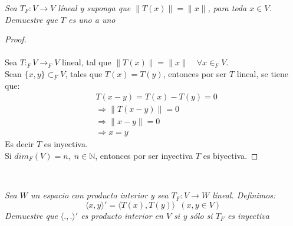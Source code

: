 \documentclass[11pt,letterpaper]{article}
\newcommand{\N}{\mathbb{N}}
\begin{document}
\begin{tcolorbox}[
	title = \textcolor{black}{\textcolor{white}{Problema 1}},]
\textit{Sea $T_F:V\rightarrow V$ l\'ineal y suponga que $\|T(x)\|=\|x\|$, para toda $x\in V$. Demuestre que $T$ es uno a uno
}
\end{tcolorbox}
\begin{proof}\,\\
	\,\\
    Sea $T:_FV\rightarrow_FV$ lineal, tal que $\|T(x)\|=\|x\|\quad \forall x \in _FV$.\\
Sean $\{ x,y\}\subset _FV$, tales que $T(x)=T(y)$, entonces por ser $T$ lineal, se tiene que:\\

\begin{align*}
    &T(x-y)=T(x)-T(y)=0\\
    &\Rightarrow \|T(x-y)\|=0\\
    &\Rightarrow \|x-y\|=0 \\
    &\Rightarrow x=y
\end{align*}
Es decir $T$ es inyectiva.\\[10pt]
Si $dim_F(V)=n,\; n\in \N$, entonces por ser inyectiva $T$ es biyectiva.
\end{proof}\,\\
\begin{tcolorbox}[
	title = \textcolor{black}{\textcolor{white}{Problema 2}},]
\textit{Sea $W$ un espacio con producto interior y sea $T_F:V\rightarrow W$ l\'ineal.
Definimos:\,\\
\begin{equation*}
    \langle x,y\rangle'=\langle T(x),T(y)\rangle\,\,\,(x,y\in V) 
\end{equation*}
Demuestre que $\langle.,. \rangle'$ es producto interior en $V$ si y s\'olo si $T_F$ es inyectiva}
\end{tcolorbox}
\end{document}
